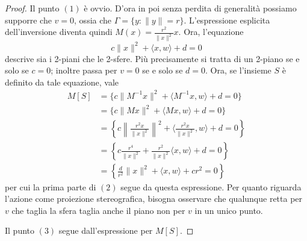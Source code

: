 \begin{proof}
	Il punto $(1)$ è ovvio. 
	D'ora in poi senza perdita di generalità possiamo supporre che $v = 0$, ossia che $\Gamma = \{y:\|y\| = r\}$. L'espressione esplicita dell'inversione diventa quindi $M(x) = \frac{r^{2}}{\|x\|^{2}}x$.
	Ora, l'equazione $$c\|x\|^{2} + \langle x,w\rangle + d = 0$$ descrive sia i 2-piani che le 2-sfere. Più precisamente si tratta di un 2-piano se e solo se $c = 0$; inoltre passa per $v = 0$ se e solo se $d = 0$. 
	Ora, se l'insieme $S$ è definito da tale equazione, vale 
	\begin{align*}
		M[S] &= 
		\{c\|M^{-1}x\|^{2} + \langle M^{-1}x, w\rangle + d = 0\} \\ &= 
		\{c\|Mx\|^{2} + \langle Mx, w\rangle + d = 0\}\\ &=
		\left\{c\left\|\frac{r^{2}x}{\|x\|^{2}}\right\|^{2} + \langle \frac{r^{2}x}{\|x\|^{2}}, w\rangle + d = 0\right\} \\&= 
		\left\{c\frac{r^{4}}{\|x\|^{2}} + \frac{r^{2}}{\|x\|^{2}}\langle x, w\rangle + d= 0\right\}\\ &= 
		\left\{\frac{d}{r^{2}}\|x\|^{2} + \langle x, w\rangle + cr^{2} = 0\right\}
	\end{align*}
	per cui la prima parte di $(2)$ segue da questa espressione. Per quanto riguarda l'azione come proiezione stereografica, bisogna osservare che qualunque retta per $v$ che taglia la sfera taglia anche il piano non per $v$ in un unico punto.
	
	Il punto $(3)$ segue dall'espressione per $M[S]$.
	

\end{proof}

